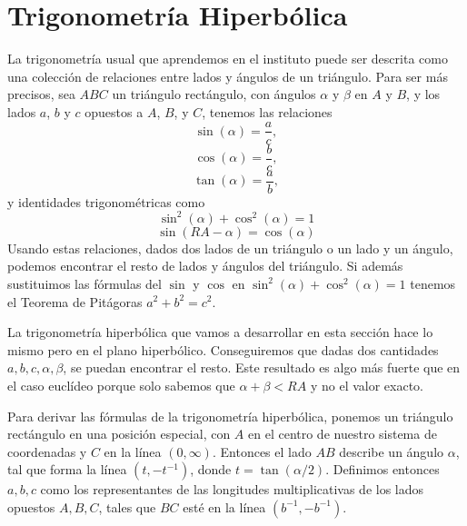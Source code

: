 \documentclass[a4paper]{amsart}
\theoremstyle{plain}
\begin{document}
\section{Trigonometría Hiperbólica}
La trigonometría usual que aprendemos en el instituto puede ser descrita como una colección de relaciones entre lados y ángulos de un triángulo.
Para ser más precisos, sea $ABC$ un triángulo rectángulo, con ángulos $\alpha$ y $\beta$ en $A$ y $B$, y los lados $a$, $b$ y $c$ opuestos a $A$, $B$, y $C$, tenemos las relaciones
\[
\sin (\alpha)=\frac{a}{c},
\]
\[
\cos (\alpha)=\frac{b}{c},
\]
\[
\tan (\alpha)=\frac{a}{b},
\]
y identidades trigonométricas como
\[
\sin^2(\alpha)+\cos^2(\alpha)=1
\]
\[
\sin(RA-\alpha)=\cos(\alpha)
\]
Usando estas relaciones, dados dos lados de un triángulo o un lado y un ángulo, podemos encontrar el resto de lados y ángulos del triángulo. Si además sustituimos las fórmulas del $\sin$ y $\cos$ en $\sin^2(\alpha)+\cos^2(\alpha)=1$ tenemos el Teorema de Pitágoras $a^2+b^2=c^2$.

La trigonometría hiperbólica que vamos a desarrollar en esta sección hace lo mismo pero en el plano hiperbólico. Conseguiremos que dadas dos cantidades $a,b,c,\alpha,\beta$, se puedan encontrar el resto. Este resultado es algo más fuerte que en el caso euclídeo porque solo sabemos que $\alpha +\beta<RA$ y no el valor exacto.

Para derivar las fórmulas de la trigonometría hiperbólica, ponemos un triángulo rectángulo en una posición especial, con $A$ en el centro de nuestro sistema de coordenadas y $C$ en la línea $(0,\infty)$. Entonces el lado $AB$ describe un ángulo $\alpha$, tal que forma la línea $(t,-t^{-1})$, donde $t=\tan(\alpha /2)$. Definimos entonces $a,b,c$ como los representantes de las longitudes multiplicativas de los lados opuestos $A,B,C$, tales que $BC$ esté en la línea $(b^{-1},-b^{-1})$.
\end{document}
